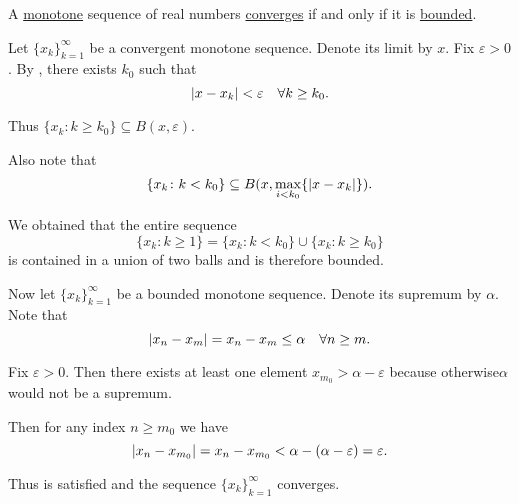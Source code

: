 \begin{Proposition}\label{thm:real_monotone_sequence_converges_iff_bounded}
  A \hyperref[def:monotone_map]{monotone} sequence of real numbers \hyperref[def:net_convergence/limit]{converges} if and only if it is \hyperref[def:metric_space/bounded_sequence]{bounded}.
\end{Proposition}
\begin{RefListProof}
    \ISufficiency Let \( \{ x_k \}_{k=1}^\infty \) be a convergent monotone sequence. Denote its limit by \( x \). Fix \( \varepsilon > 0 \). By , there exists \( k_0 \) such that
    \begin{equation*}
      \left\vert x - x_k \right\vert < \varepsilon \quad\forall k \geq k_0.
    \end{equation*}

    Thus \( \{ x_k \colon k \geq k_0 \} \subseteq B(x, \varepsilon) \).

    Also note that
    \begin{equation*}
      \{ x_k \colon k < k_0 \} \subseteq B(x, \max_{i < k_0} \{ \left\vert x - x_k \right\vert \}).
    \end{equation*}

    We obtained that the entire sequence
    \begin{equation*}
      \{ x_k \colon k \geq 1 \} = \{ x_k \colon k < k_0 \} \cup \{ x_k \colon k \geq k_0 \}
    \end{equation*}
    is contained in a union of two balls and is therefore bounded.

    \INecessity Now let \( \{ x_k \}_{k=1}^\infty \) be a bounded monotone sequence. Denote its supremum by \( \alpha \). Note that
    \begin{equation*}
      \left\vert x_n - x_m \right\vert = x_n - x_m \leq \alpha \quad\forall n \geq m.
    \end{equation*}

    Fix \( \varepsilon > 0 \). Then there exists at least one element \( x_{m_0} > \alpha - \varepsilon \) because otherwise\LEM \( \alpha \) would not be a supremum.

    Then for any index \( n \geq m_0 \) we have
    \begin{equation*}
      \left\vert x_n - x_{m_0} \right\vert = x_n - x_{m_0} < \alpha - (\alpha - \varepsilon) = \varepsilon.
    \end{equation*}

    Thus  is satisfied and the sequence \( \{ x_k \}_{k=1}^\infty \) converges.
\end{RefListProof}
